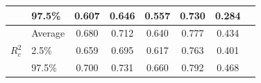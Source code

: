 \begin{table}[ht]
\begin{tabular}{@{}llcccccc@{}}
                                           & 97.5\%  & 0.607 & 0.646 & 0.557 & 0.730 & 0.284 \\ \midrule
      \multirow{3}{*}{$R^2_c$}            & Average & 0.680 & 0.712 & 0.640 & 0.777 & 0.434 \\
                                           & 2.5\%   & 0.659 & 0.695 & 0.617 & 0.763 & 0.401 \\
                                           & 97.5\%  & 0.700 & 0.731 & 0.660 & 0.792 & 0.468 \\ \bottomrule
    \end{tabular}

\end{table}
